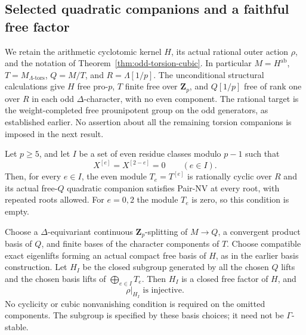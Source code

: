 \subsection{Selected quadratic companions and a faithful free factor}
\label{sec:selected-pair-faithfulness}

We retain the arithmetic cyclotomic kernel $H$, its actual rational
outer action $\rho$, and the notation of
Theorem~\ref{thm:odd-torsion-cubic}. In particular
$M=H^{\mathrm{ab}}$, $T=M_{\Lambda\text{-tors}}$,
$Q=M/T$, and $R=\Lambda[1/p]$. The unconditional structural
calculations give $H$ free pro-$p$, $T$ finite free over
$\mathbf Z_p$, and $Q[1/p]$ free of rank one over $R$ in each
odd $\Delta$-character, with no even component. The rational
target is the weight-completed free prounipotent group on the
odd generators, as established earlier. No assertion about all
the remaining torsion companions is imposed in the next result.

\begin{theorem}
\label{thm:selected-pair-faithfulness}
Let $p\geq5$, and let $I$ be a set of even residue classes
modulo $p-1$ such that
\[
                 X^{[e]}=X^{[2-e]}=0\qquad(e\in I).
 \tag{SP.1}
\]
Then, for every $e\in I$, the even module $T_e=T^{[e]}$
is rationally cyclic over $R$ and its actual free-$Q$ quadratic
companion satisfies Pair-NV at every root, with repeated roots
allowed. For $e=0,2$ the module $T_e$ is zero, so this condition
is empty.

Choose a $\Delta$-equivariant continuous $\mathbf Z_p$-splitting
of $M\to Q$, a convergent product basis of $Q$, and finite
bases of the character components of $T$. Choose compatible
exact eigenlifts forming an actual compact free basis of $H$,
as in the earlier basis construction. Let $H_I$ be the closed
subgroup generated by all the chosen $Q$ lifts and the chosen
basis lifts of $\bigoplus_{e\in I}T_e$. Then $H_I$ is a closed
free factor of $H$, and
\[
                         \rho|_{H_I}\text{ is injective}.
 \tag{SP.2}
\]
No cyclicity or cubic nonvanishing condition is required on
the omitted components. The subgroup is specified by these
basis choices; it need not be $\Gamma$-stable.
\end{theorem}

